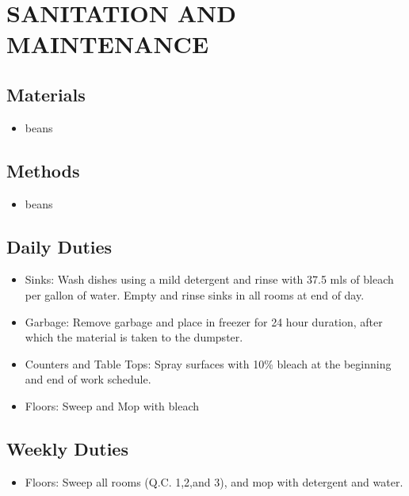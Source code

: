 \documentclass{sop_class}[overrideChapters] %
\providecommand{\tightlist}{%
  \setlength{\itemsep}{0pt}\setlength{\parskip}{0pt}}
\begin{document}
{{\chapter{SANITATION AND MAINTENANCE}\label{facility}}

\hypertarget{materials-5}{%
\section{Materials}\label{materials-5}}
\begin{itemize}
\tightlist
\item
  beans
\end{itemize}
\hypertarget{methods-5}{%
\section{Methods}\label{methods-5}}
\begin{itemize}
\tightlist
\item
  beans
\end{itemize}
\hypertarget{daily-duties}{%
\section{Daily Duties}\label{daily-duties}}
\begin{itemize}
\tightlist
\item
  Sinks: Wash dishes using a mild detergent and rinse with 37.5 mls of
  bleach per gallon of water. Empty and rinse sinks in all rooms at
  end of day.
\item
  Garbage: Remove garbage and place in freezer for 24 hour duration,
  after which the material is taken to the dumpster.
\item
  Counters and Table Tops: Spray surfaces with 10\% bleach at the
  beginning and end of work schedule.
\item
  Floors: Sweep and Mop with bleach
\end{itemize}
\hypertarget{weekly-duties}{%
\section{Weekly Duties}\label{weekly-duties}}
\begin{itemize}
\tightlist
\item
  Floors: Sweep all rooms (Q.C. 1,2,and 3), and mop with detergent and
  water.
\end{itemize}
\hypertarget{monthly-duties}{%
}}
\end{document}

